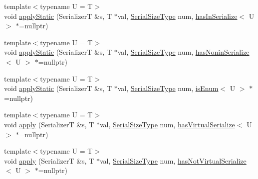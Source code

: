 \begin{DoxyCompactItemize}
{\footnotesize template$<$typename U  = T$>$ }\\void \hyperlink{structcheckpoint_1_1dispatch_1_1_serializer_dispatch_non_byte_a5c76cadd528c3d2348a3963d44402aea}{apply\+Static} (SerializerT \&s, T $\ast$val, \hyperlink{namespacecheckpoint_a083f6674da3f94c2901b18c6d238217c}{Serial\+Size\+Type} num, \hyperlink{structcheckpoint_1_1dispatch_1_1_serializer_dispatch_non_byte_aee0190efdd8f0239a09883a9f59a4dd1}{has\+In\+Serialize}$<$ U $>$ $\ast$=nullptr)
\item 
{\footnotesize template$<$typename U  = T$>$ }\\void \hyperlink{structcheckpoint_1_1dispatch_1_1_serializer_dispatch_non_byte_a1bdb0ab1fae98f7c72d5770d0803494b}{apply\+Static} (SerializerT \&s, T $\ast$val, \hyperlink{namespacecheckpoint_a083f6674da3f94c2901b18c6d238217c}{Serial\+Size\+Type} num, \hyperlink{structcheckpoint_1_1dispatch_1_1_serializer_dispatch_non_byte_aee9d815f18b48855fefbecbbbf60436b}{has\+Nonin\+Serialize}$<$ U $>$ $\ast$=nullptr)
\item 
{\footnotesize template$<$typename U  = T$>$ }\\void \hyperlink{structcheckpoint_1_1dispatch_1_1_serializer_dispatch_non_byte_a0aec94a0c69c27fc13f6dc0f923d2f50}{apply\+Static} (SerializerT \&s, T $\ast$val, \hyperlink{namespacecheckpoint_a083f6674da3f94c2901b18c6d238217c}{Serial\+Size\+Type} num, \hyperlink{structcheckpoint_1_1dispatch_1_1_serializer_dispatch_non_byte_ac47ded9971a3ed3d8d1824d1ff12031a}{is\+Enum}$<$ U $>$ $\ast$=nullptr)
\item 
{\footnotesize template$<$typename U  = T$>$ }\\void \hyperlink{structcheckpoint_1_1dispatch_1_1_serializer_dispatch_non_byte_a12e7e180be642ec9eaaac93972e28856}{apply} (SerializerT \&s, T $\ast$val, \hyperlink{namespacecheckpoint_a083f6674da3f94c2901b18c6d238217c}{Serial\+Size\+Type} num, \hyperlink{structcheckpoint_1_1dispatch_1_1_serializer_dispatch_non_byte_a51b98addaa52e3e576c48c150aa66583}{has\+Virtual\+Serialize}$<$ U $>$ $\ast$=nullptr)
\item 
{\footnotesize template$<$typename U  = T$>$ }\\void \hyperlink{structcheckpoint_1_1dispatch_1_1_serializer_dispatch_non_byte_ae6e291caec4d650a7d91e78a209a1964}{apply} (SerializerT \&s, T $\ast$val, \hyperlink{namespacecheckpoint_a083f6674da3f94c2901b18c6d238217c}{Serial\+Size\+Type} num, \hyperlink{structcheckpoint_1_1dispatch_1_1_serializer_dispatch_non_byte_aa9c0d5e9e139a9d922b1ce4adf339465}{has\+Not\+Virtual\+Serialize}$<$ U $>$ $\ast$=nullptr)
\end{DoxyCompactItemize}



